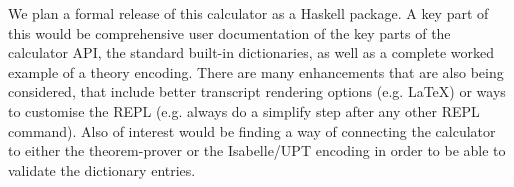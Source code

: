 
We plan a formal release of this calculator as a Haskell package.
A key part of this would be comprehensive
user documentation of the key parts of the calculator API,
the standard built-in dictionaries,
as well as a complete worked example of a theory encoding.
There are many enhancements that are also being considered,
that include better transcript rendering options
(e.g. \LaTeX) or ways to customise the REPL
(e.g. always do a simplify step after any other REPL command).
Also of interest would be finding
a way of connecting the calculator
to either the  theorem-prover\cite{DBLP:conf/utp/Butterfield10}
or the Isabelle/UPT encoding\cite{DBLP:conf/utp/FosterZW14}
in order to be able to validate the dictionary entries.
